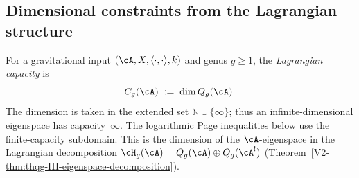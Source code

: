 \subsection{Dimensional constraints from the Lagrangian structure}
\label{subsec:thqg-entanglement-dimensional}

\begin{definition}
\label{def:thqg-lagrangian-capacity}
For a gravitational input $(\cA, X, \langle \cdot, \cdot \rangle, k)$
and genus $g \ge 1$, the \emph{Lagrangian capacity} is
\begin{equation}\label{eq:thqg-lagrangian-capacity}
C_g(\cA)
\;:=\;
\dim Q_g(\cA).
\end{equation}
The dimension is taken in the extended set
$\mathbb N\cup\{\infty\}$; thus an infinite-dimensional eigenspace
has capacity~$\infty$.  The logarithmic Page inequalities below use
the finite-capacity subdomain.
This is the dimension of the $\cA$-eigenspace in the
Lagrangian decomposition
$\cH_g(\cA) = Q_g(\cA) \oplus Q_g(\cA^!)$
(Theorem~\ref{V2-thm:thqg-III-eigenspace-decomposition}).
\end{definition}

